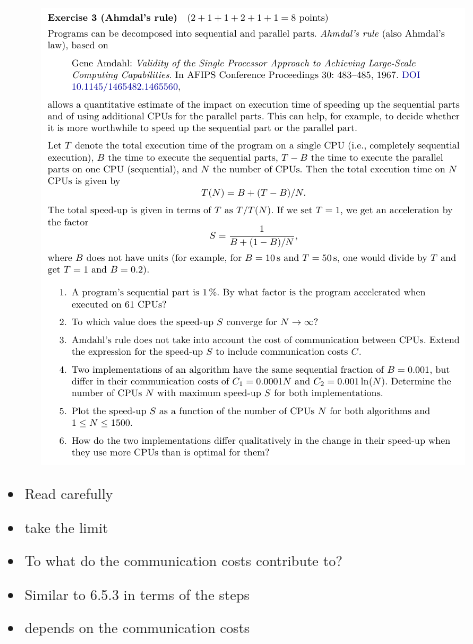 \documentclass[10pt]{beamer}
\begin{document}
\begin{frame}{}
         \begin{figure}
          \includegraphics[keepaspectratio, width=\textwidth, height=\textheight-2\baselineskip-2\baselineskip]{img/ex8_102.png} \\
        \end{figure}
        \framebreak
        \begin{itemize}
         \item Read carefully
         \item take the limit
         \item To what do the communication costs contribute to?
         \item Similar to 6.5.3 in terms of the steps
         \item depends on the communication costs
        \end{itemize}
        \framebreak 
        

\end{frame}
\end{document}
